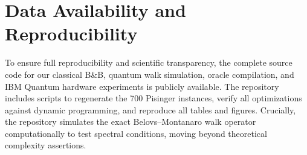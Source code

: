 \documentclass[conference]{IEEEtran} \IEEEoverridecommandlockouts
\begin{document}
\section{Data Availability and Reproducibility}

To ensure full reproducibility and scientific transparency, the complete source code for our classical B\&B, quantum walk simulation, oracle compilation, and IBM Quantum hardware experiments is publicly available. The repository includes scripts to regenerate the 700 Pisinger instances, verify all optimizations against dynamic programming, and reproduce all tables and figures. Crucially, the repository simulates the exact Belovs--Montanaro walk operator computationally to test spectral conditions, moving beyond theoretical complexity assertions.










 
\end{document}
